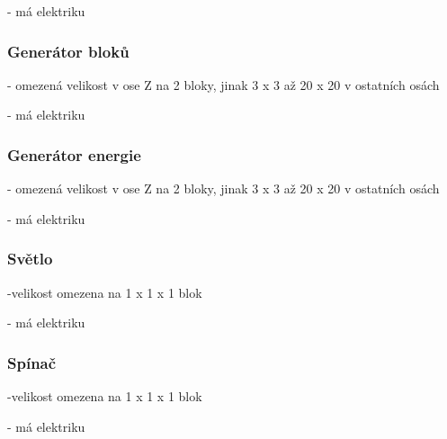 - má elektriku

\subsubsection{Generátor bloků}

- omezená velikost v ose Z na 2 bloky, jinak 3 x 3 až 20 x 20 v ostatních osách

- má elektriku

\subsubsection{Generátor energie}

- omezená velikost v ose Z na 2 bloky, jinak 3 x 3 až 20 x 20 v ostatních osách

- má elektriku

\subsubsection{Světlo}

-velikost omezena na 1 x 1 x 1 blok

- má elektriku

\subsubsection{Spínač}


-velikost omezena na 1 x 1 x 1 blok

- má elektriku
